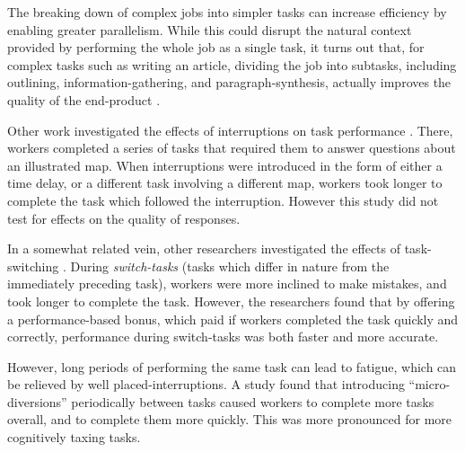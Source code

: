 \documentclass{sigchi}
\begin{document}
The breaking down of complex jobs into simpler tasks can increase
efficiency by enabling greater parallelism.
While this could disrupt the natural context provided by performing the
whole job as a single task, it turns out that, 
for complex tasks such as writing an article, 
dividing the job into subtasks, including outlining, 
information-gathering, and paragraph-synthesis, actually improves the
quality of the end-product \cite{kittur2011crowdforge}.

Other work investigated the effects of interruptions on task performance
\cite{laseckieffects}.  There, workers 
completed a series of tasks that required them to answer questions about
an illustrated map.  When interruptions were introduced
in the form of either a time delay, or a different task involving a
different map, workers took longer to complete the task which 
followed the interruption.  However this study did not test for
effects on the quality of responses.  

In a somewhat related vein, other researchers investigated 
the effects of task-switching \cite{yin2014monetary}.  During 
\textit{switch-tasks} (tasks which differ in nature from the immediately 
preceding task), workers were more inclined to make mistakes, 
and took longer to complete the task.  
However, the researchers found that by offering a performance-based
bonus, which paid if workers completed the task quickly and correctly,
performance during switch-tasks was both faster and more accurate.

However, long periods of performing the same task can lead to fatigue,
which can be relieved by well placed-interruptions.  A study 
\cite{dai2015and} found that introducing ``micro-diversions'' 
periodically between tasks caused workers to complete more tasks overall, 
and to complete them more quickly.  This was more pronounced for more 
cognitively taxing tasks.
\end{document}
